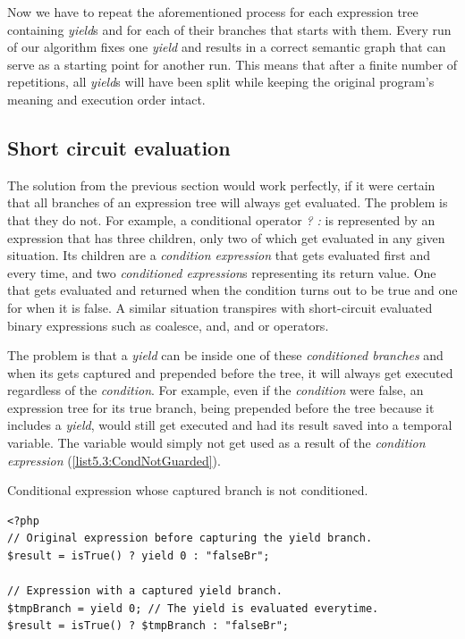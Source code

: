 Now we have to repeat the aforementioned process for each expression tree containing \emph{yield}s and for each of their branches that starts with them. Every run of our algorithm fixes one \emph{yield} and results in a correct semantic graph that can serve as a starting point for another run. This means that after a finite number of repetitions, all \emph{yield}s will have been split while keeping the original program’s meaning and execution order intact.

\subsection{Short circuit evaluation}\label{shortCircTheory}

The solution from the previous section would work perfectly, if it were certain that all branches of an expression tree will always get evaluated. The problem is that they do not. For example, a conditional operator \emph{? :} is represented by an expression that has three children, only two of which get evaluated in any given situation. Its children are a \emph{condition expression} that gets evaluated first and every time, and two \emph{conditioned expression}s representing its return value. One that gets evaluated and returned when the condition turns out to be true and one for when it is false. A similar situation transpires with short-circuit evaluated binary expressions such as coalesce, and, and or operators.

The problem is that a \emph{yield} can be inside one of these \emph{conditioned branches} and when its gets captured and prepended before the tree, it will always get executed regardless of the \emph{condition}. For example, even if the \emph{condition} were false, an expression tree for its true branch, being prepended before the tree because it includes a \emph{yield}, would still get executed and had its result saved into a temporal variable. The variable would simply not get used as a result of the \emph{condition expression} (\autoref{list5.3:CondNotGuarded}).

\begin{listing}[H]
\caption{Conditional expression whose captured branch is not conditioned.}
\label{list5.3:CondNotGuarded}
\begin{verbatim}
<?php
// Original expression before capturing the yield branch.
$result = isTrue() ? yield 0 : "falseBr";

// Expression with a captured yield branch.
$tmpBranch = yield 0; // The yield is evaluated everytime.
$result = isTrue() ? $tmpBranch : "falseBr";
\end{verbatim}
\end{listing}

